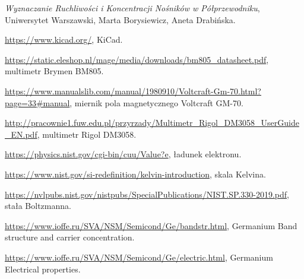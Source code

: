 \documentclass[12pt]{article}
\begin{document}
\begin{thebibliography}{9}

\emph{Wyznaczanie Ruchliwości i Koncentracji Nośników w Półprzewodniku}, Uniwersytet Warszawski, Marta Borysiewicz, Aneta Drabińska.

\url{https://www.kicad.org/}, KiCad.

\url{https://static.eleshop.nl/mage/media/downloads/bm805_datasheet.pdf}, multimetr Brymen BM805.

\url{https://www.manualslib.com/manual/1980910/Voltcraft-Gm-70.html?page=33#manual}, miernik pola magnetycznego Voltcraft GM-70.

\url{http://pracownie1.fuw.edu.pl/przyrzady/Multimetr_Rigol_DM3058_UserGuide_EN.pdf}, multimetr Rigol DM3058.

\url{https://physics.nist.gov/cgi-bin/cuu/Value?e}, ładunek elektronu.

\url{https://www.nist.gov/si-redefinition/kelvin-introduction}, skala Kelvina.

\url{https://nvlpubs.nist.gov/nistpubs/SpecialPublications/NIST.SP.330-2019.pdf}, stała Boltzmanna.

\url{https://www.ioffe.ru/SVA/NSM/Semicond/Ge/bandstr.html}, Germanium Band structure and carrier concentration.

\url{https://www.ioffe.ru/SVA/NSM/Semicond/Ge/electric.html}, Germanium Electrical properties.


\end{thebibliography}
\end{document}

